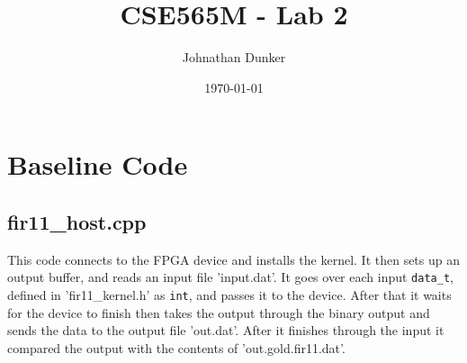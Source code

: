 \documentclass[11pt]{article}
\title{CSE565M - Lab 2}
\author{Johnathan Dunker}
\date{\today}
\begin{document}
  \maketitle

    \section{Baseline Code}
      \subsection{fir11\_host.cpp}
      This code connects to the FPGA device and installs the kernel. It then sets up an output buffer, and reads an input file 'input.dat'. It goes over each input \texttt{data\_t}, defined in 'fir11\_kernel.h' as \texttt{int}, and passes it to the device. After that it waits for the device to finish then takes the output through the binary output and sends the data to the output file 'out.dat'. After it finishes through the input it compared the output with the contents of 'out.gold.fir11.dat'.
\end{document}
